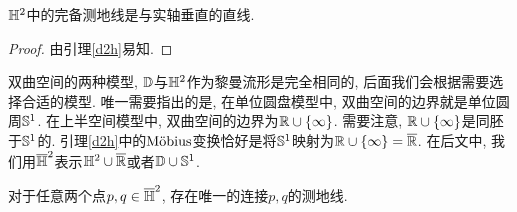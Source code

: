 \begin{theorem}
    $\HH$中的完备测地线是与实轴垂直的直线.
\end{theorem}
\begin{proof}
    由引理\eqref{d2h}易知.
\end{proof}
\begin{remark}
    双曲空间的两种模型, $\D$与$\HH$作为黎曼流形是完全相同的, 后面我们会根据需要选择合适的模型. 唯一需要指出的是, 在单位圆盘模型中,  双曲空间的边界就是单位圆周$\S^1$. 在上半空间模型中, 双曲空间的边界为$\R \cup \{\infty\}$.  需要注意, $\R\cup \{\infty\}$是同胚于$\S^1$的.  引理\eqref{d2h}中的$\mobius$变换恰好是将$\S^1$映射为$\R \cup \{\infty\}=\RR$.  在后文中, 我们用$\HC$表示$\HH \cup \RR$或者$\D \cup \S^1$.
\end{remark}
\begin{corollary} \label{unique_geodesic}
    对于任意两个点$p,q \in \HC$, 存在唯一的连接$p,q$的测地线.
\end{corollary}
